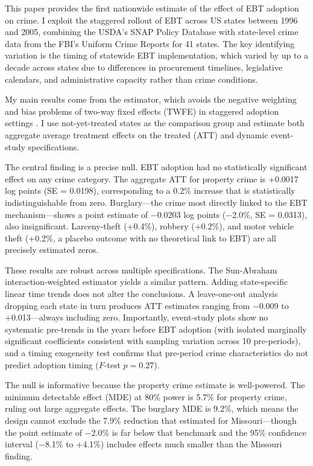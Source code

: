 \documentclass[12pt]{article}
\begin{document}
This paper provides the first nationwide estimate of the effect of EBT adoption on crime. I exploit the staggered rollout of EBT across US states between 1996 and 2005, combining the USDA's SNAP Policy Database with state-level crime data from the FBI's Uniform Crime Reports for 41 states. The key identifying variation is the timing of statewide EBT implementation, which varied by up to a decade across states due to differences in procurement timelines, legislative calendars, and administrative capacity rather than crime conditions.

My main results come from the \citet{callaway2021difference} estimator, which avoids the negative weighting and bias problems of two-way fixed effects (TWFE) in staggered adoption settings \citep{goodman2021difference, dechaisemartin2020two, sun2021estimating}. I use not-yet-treated states as the comparison group and estimate both aggregate average treatment effects on the treated (ATT) and dynamic event-study specifications.

The central finding is a precise null. EBT adoption had no statistically significant effect on any crime category. The aggregate ATT for property crime is +0.0017 log points (SE = 0.0198), corresponding to a 0.2\% increase that is statistically indistinguishable from zero. Burglary---the crime most directly linked to the EBT mechanism---shows a point estimate of $-$0.0203 log points ($-$2.0\%, SE = 0.0313), also insignificant. Larceny-theft (+0.4\%), robbery (+0.2\%), and motor vehicle theft (+0.2\%, a placebo outcome with no theoretical link to EBT) are all precisely estimated zeros.

These results are robust across multiple specifications. The Sun-Abraham interaction-weighted estimator yields a similar pattern. Adding state-specific linear time trends does not alter the conclusions. A leave-one-out analysis dropping each state in turn produces ATT estimates ranging from $-$0.009 to +0.013---always including zero. Importantly, event-study plots show no systematic pre-trends in the years before EBT adoption (with isolated marginally significant coefficients consistent with sampling variation across 10 pre-periods), and a timing exogeneity test confirms that pre-period crime characteristics do not predict adoption timing ($F$-test $p = 0.27$).

The null is informative because the property crime estimate is well-powered. The minimum detectable effect (MDE) at 80\% power is 5.7\% for property crime, ruling out large aggregate effects. The burglary MDE is 9.2\%, which means the design cannot exclude the 7.9\% reduction that \citet{wright2017less} estimated for Missouri---though the point estimate of $-$2.0\% is far below that benchmark and the 95\% confidence interval ($-$8.1\% to +4.1\%) includes effects much smaller than the Missouri finding.
\end{document}
